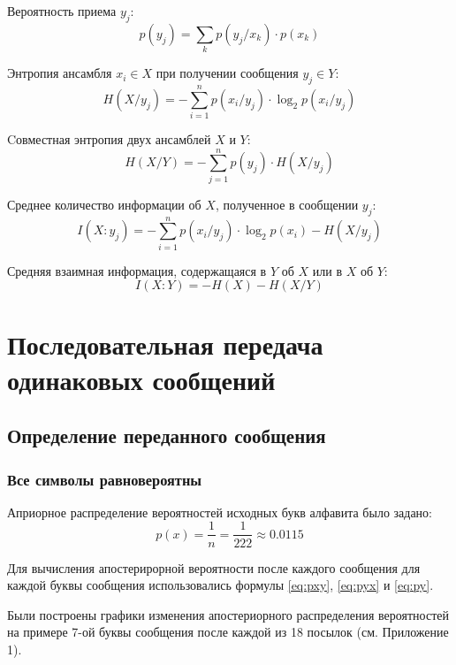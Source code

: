 Вероятность приема $y_j$:
\begin{equation}\label{eq:py}
	p(y_j) = \sum_k p(y_j/x_k)\cdot p(x_k)
\end{equation}

Энтропия ансамбля $x_i \in X$ при получении сообщения $y_j \in Y$:
\begin{equation}\label{eq:hxyj}
	H(X/y_j) = - \sum_{i=1}^n p(x_i/y_j)\cdot \log_2 p(x_i/y_j)
\end{equation}

Cовместная энтропия двух ансамблей $X$ и $Y$: 
\begin{equation}\label{eq:hxy}
	H(X/Y) = - \sum_{j=1}^n p(y_j)\cdot H(X/y_j)
\end{equation}

Среднее количество информации об $X$, полученное в сообщении $y_j$:
\begin{equation}\label{eq:ixyj}
	I(X:y_j) = - \sum_{i=1}^n p(x_i/y_j)\cdot \log_2 p(x_i) - H(X/y_j)
\end{equation}

Средняя взаимная информация, содержащаяся в $Y$ об $X$ или в $X$ об $Y$: 
\begin{equation}\label{eq:ixy}
	I(X:Y) = - H(X) - H(X/Y)
\end{equation}

\section{Последовательная передача одинаковых сообщений}

\subsection{Определение переданного сообщения}

\subsubsection{Все символы равновероятны}

Априорное распределение вероятностей исходных букв алфавита было задано:
\begin{equation}
	p(x) = \frac{1}{n} = \frac{1}{222} \approx 0.0115
\end{equation}

Для вычисления апостерирорной вероятности после каждого сообщения для каждой буквы сообщения использовались формулы \ref{eq:pxy}, \ref{eq:pyx} и \ref{eq:py}.

Были построены графики изменения апостериорного распределения вероятностей на примере 7-ой буквы сообщения после каждой из 18 посылок (см. Приложение 1).

